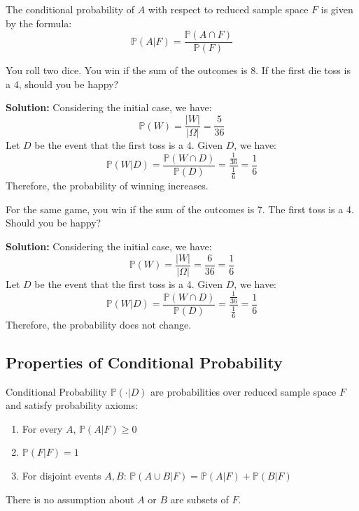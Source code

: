 The conditional probability of \(A\) with respect to reduced sample space \(F\) is given by the formula: 
\[
    \mathbb{P}(A|F) = \dfrac{\mathbb{P}(A \cap F)}{\mathbb{P}(F)}
\]

\begin{eg}
    You roll two dice. You win if the sum of the outcomes is 8. If the first die toss is a 4, should you be happy?

    \textbf{Solution:}
    Considering the initial case, we have:
    \[
        \mathbb{P}(W) = \dfrac{\vert W \vert}{\vert \Omega \vert} = \dfrac{5}{36}
    \]
    Let \(D\) be the event that the first toss is a 4. Given \(D\), we have:
    \[
        \mathbb{P}(W|D) = \dfrac{\mathbb{P}(W \cap D)}{\mathbb{P}(D)} = \dfrac{\frac{1}{36}}{\frac{1}{6}} = \dfrac{1}{6}
    \]
    Therefore, the probability of winning increases. 
\end{eg}

\begin{eg}
    For the same game, you win if the sum of the outcomes is 7. The first toss is a 4. Should you be happy?

    \textbf{Solution:} 
    Considering the initial case, we have:
    \[
        \mathbb{P}(W) = \dfrac{\vert W \vert}{\vert \Omega \vert} = \dfrac{6}{36} = \dfrac{1}{6}
    \]
    Let \(D\) be the event that the first toss is a 4. Given \(D\), we have:
    \[
        \mathbb{P}(W|D) = \dfrac{\mathbb{P}(W \cap D)}{\mathbb{P}(D)} = \dfrac{\frac{1}{36}}{\frac{1}{6}} = \dfrac{1}{6}
    \]
    Therefore, the probability does not change. 
\end{eg}

\subsection{Properties of Conditional Probability}
\begin{proposition}
    Conditional Probability \(\mathbb{P}(\cdot|D)\) are probabilities over reduced sample space \(F\) and satisfy probability axioms:
    \begin{enumerate}
        \item For every \(A\), \(\mathbb{P}(A|F) \geq  0\)
        \item \(\mathbb{P}(F|F) = 1\)
        \item For disjoint events \(A, B\): \(\mathbb{P}(A \cup B|F) = \mathbb{P}(A|F) + \mathbb{P}(B|F)\)    
    \end{enumerate}

    \begin{remark}
        There is no assumption about \(A\) or \(B\) are subsets of \(F\).
    \end{remark}
\end{proposition}


